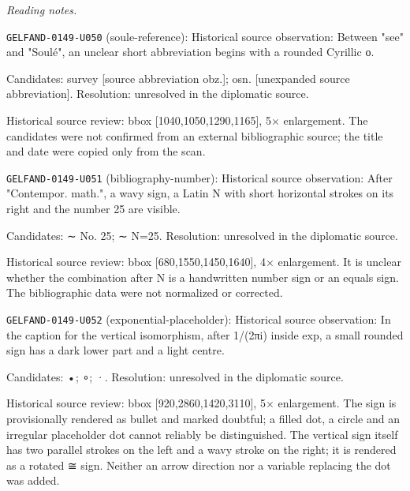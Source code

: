 \par\smallskip\noindent\textit{Reading notes.}\par
\noindent\texttt{GELFAND-0149-U050} (soule-reference): Historical source observation: Between "see" and "Soulé", an unclear short abbreviation begins with a rounded Cyrillic о.\par
Candidates: survey [source abbreviation obz.]; osn. [unexpanded source abbreviation]. Resolution: unresolved in the diplomatic source.\par
Historical source review: bbox [1040,1050,1290,1165], 5× enlargement. The candidates were not confirmed from an external bibliographic source; the title and date were copied only from the scan.\par

\noindent\texttt{GELFAND-0149-U051} (bibliography-number): Historical source observation: After "Contempor. math.", a wavy sign, a Latin N with short horizontal strokes on its right and the number 25 are visible.\par
Candidates: ∼ No. 25; ∼ N=25. Resolution: unresolved in the diplomatic source.\par
Historical source review: bbox [680,1550,1450,1640], 4× enlargement. It is unclear whether the combination after N is a handwritten number sign or an equals sign. The bibliographic data were not normalized or corrected.\par

\noindent\texttt{GELFAND-0149-U052} (exponential-placeholder): Historical source observation: In the caption for the vertical isomorphism, after 1/(2πi) inside exp, a small rounded sign has a dark lower part and a light centre.\par
Candidates: •; ∘; ·. Resolution: unresolved in the diplomatic source.\par
Historical source review: bbox [920,2860,1420,3110], 5× enlargement. The sign is provisionally rendered as bullet and marked doubtful; a filled dot, a circle and an irregular placeholder dot cannot reliably be distinguished. The vertical sign itself has two parallel strokes on the left and a wavy stroke on the right; it is rendered as a rotated ≅ sign. Neither an arrow direction nor a variable replacing the dot was added.\par



